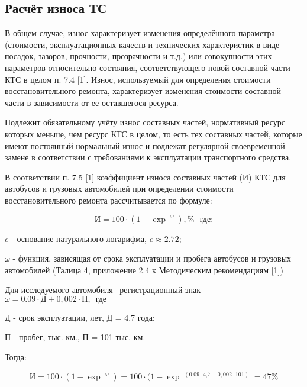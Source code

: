 \subsection{Расчёт износа ТС }

В общем случае, износ характеризует изменения определённого параметра (стоимости, эксплуатационных качеств и технических характеристик в виде посадок, зазоров, прочности, прозрачности и т.д.) или совокупности этих параметров относительно состояния, соответствующего новой составной части КТС в целом п. 7.4 [1]. Износ, используемый для определения стоимости восстановительного ремонта, характеризует изменения стоимости составной части в зависимости от ее оставшегося ресурса.

Подлежит обязательному учёту износ составных частей, нормативный ресурс которых меньше, чем ресурс КТС в целом, то есть тех составных частей, которые имеют постоянный нормальный износ и подлежат регулярной своевременной замене в соответствии с требованиями к эксплуатации транспортного средства.



В соответствии п. 7.5 [1] коэффициент износа составных частей (И) КТС для автобусов и грузовых автомобилей при определении стоимости восстановительного ремонта рассчитывается по формуле:

\begin{equation}\label{eqsnos}
\text{И} =100\cdot(1-\exp^{-\omega}), \%  \,\,\,\, \text{где:}
\end{equation}

$ e $ - основание натурального логарифма, $ e \approx 2.72  $;

$ \omega $ - функция, зависящая от срока эксплуатации и пробега автобусов и грузовых автомобилей (Талица 4, приложение 2.4 к Методическим рекомендациям [1])


Для исследуемого автомобиля \, регистрационный знак  \\ $\omega = 0.09\cdot\text{Д} + 0,002\cdot\text{П}, \,\,\, \text{где}  $ 

Д - срок эксплуатации, лет, Д = 4,7 года;

П - пробег, тыс. км., П = 101 тыс. км.

Тогда:

\begin{equation}\label{eqsnos1}
\text{И} =100\cdot(1-\exp^{-\omega}) = 100\cdot(1-\exp^{-(0.09\cdot\text{4,7} + 0,002\cdot\text{101})} = 47\%
\end{equation}


